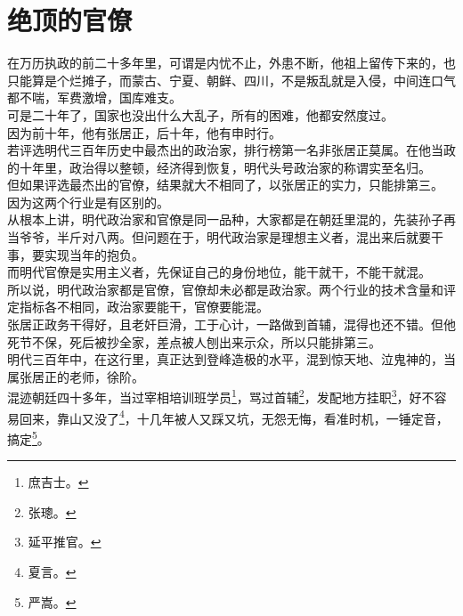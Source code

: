 \section{绝顶的官僚}
\ifnum{}
	\begin{multicols}{\theparacolNo}
\fi
在万历执政的前二十多年里，可谓是内忧不止，外患不断，他祖上留传下来的，也只能算是个烂摊子，而蒙古、宁夏、朝鲜、四川，不是叛乱就是入侵，中间连口气都不喘，军费激增，国库难支。\\

可是二十年了，国家也没出什么大乱子，所有的困难，他都安然度过。\\

因为前十年，他有张居正，后十年，他有申时行。\\

若评选明代三百年历史中最杰出的政治家，排行榜第一名非张居正莫属。在他当政的十年里，政治得以整顿，经济得到恢复，明代头号政治家的称谓实至名归。\\

但如果评选最杰出的官僚，结果就大不相同了，以张居正的实力，只能排第三。\\

因为这两个行业是有区别的。\\

从根本上讲，明代政治家和官僚是同一品种，大家都是在朝廷里混的，先装孙子再当爷爷，半斤对八两。但问题在于，明代政治家是理想主义者，混出来后就要干事，要实现当年的抱负。\\

而明代官僚是实用主义者，先保证自己的身份地位，能干就干，不能干就混。\\

所以说，明代政治家都是官僚，官僚却未必都是政治家。两个行业的技术含量和评定指标各不相同，政治家要能干，官僚要能混。\\

张居正政务干得好，且老奸巨滑，工于心计，一路做到首辅，混得也还不错。但他死节不保，死后被抄全家，差点被人刨出来示众，所以只能排第三。\\

明代三百年中，在这行里，真正达到登峰造极的水平，混到惊天地、泣鬼神的，当属张居正的老师，徐阶。\\

混迹朝廷四十多年，当过宰相培训班学员\footnote{庶吉士。}，骂过首辅\footnote{张璁。}，发配地方挂职\footnote{延平推官。}，好不容易回来，靠山又没了\footnote{夏言。}，十几年被人又踩又坑，无怨无悔，看准时机，一锤定音，搞定\footnote{严嵩。}。\\


\end{multicols}
